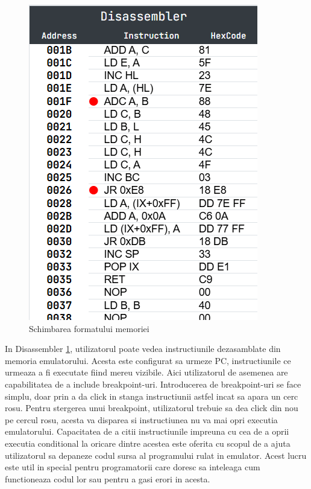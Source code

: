 \documentclass[titlepage,12pt]{article}
\begin{document}
\begin{figure}
    \centering
    \includegraphics[width=\linewidth]{images/disassembler.png}
    \caption{Schimbarea formatului memoriei}
    \label{fig:disassembler}
\end{figure}

In Disassembler \cref {fig:disassembler}, utilizatorul poate vedea instructiunile dezasamblate din memoria emulatorului. Acesta este configurat sa urmeze PC, instructiunile ce urmeaza a fi executate fiind mereu vizibile. Aici utilizatorul de asemenea are capabilitatea de a include breakpoint-uri. Introducerea de breakpoint-uri se face simplu, doar prin a da click in stanga instructiunii astfel incat sa apara un cerc rosu. Pentru stergerea unui breakpoint, utilizatorul trebuie sa dea click din nou pe cercul rosu, acesta va disparea si instructiunea nu va mai opri executia emulatorului. Capacitatea de a citii instructiunile impreuna cu cea de a oprii executia conditional la oricare dintre acestea este oferita cu scopul de a ajuta utilizatorul sa depaneze codul sursa al programului rulat in emulator. Acest lucru este util in special pentru programatorii care doresc sa inteleaga cum functioneaza codul lor sau pentru a gasi erori in acesta.
\end{document}
